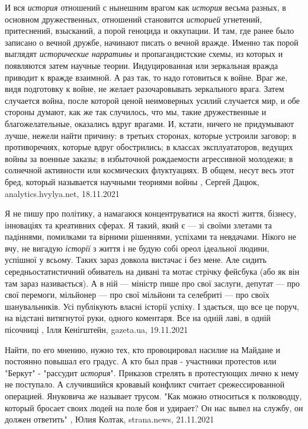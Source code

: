 И вся \emph{история} отношений с нынешним врагом как \emph{история} весьма
разных, в основном дружественных, отношений становится \emph{историей}
угнетений, притеснений, взысканий, а порой геноцида и оккупации.  И там, где
ранее было записано о вечной дружбе, начинают писать о вечной вражде. Именно
так порой выглядят \emph{исторические нарративы} и пропагандистские схемы, из
которых и появляются затем научные теории.  Индуцированная или зеркальная
вражда приводит к вражде взаимной. А раз так, то надо готовиться к войне. Враг
же, видя подготовку к войне, не желает разочаровывать зеркального врага.  Затем
случается война, после которой ценой неимоверных усилий случается мир, и обе
стороны думают, как же так случилось, что мы, такие дружественные и
благожелательные, оказались вдруг врагами.  И, кстати, ничего не придумывают
лучше, нежели найти причину: в третьих сторонах, которые устроили заговор; в
противоречиях, которые вдруг обострились; в классах эксплуататоров, ведущих
войны за военные заказы; в избыточной рождаемости агрессивной молодежи; в
солнечной активности или космических флуктуациях. В общем, несут весь этот
бред, который называется научными теориями войны
, Сергей Дацюк, analytics.hvylya.net, 18.11.2021

Я не пишу про політику, а намагаюся концентруватися на якості життя, бізнесу,
інноваціях та креативних сферах. Я такий, який є — зі своїми злетами та
падіннями, помилками та вірними рішеннями, успіхами та невдачами. Нікого не
вчу, не вигадую \emph{історії} з життя і не будую собі ореол ідеальної людини,
успішної у всьому. Таких зараз довкола вистачає і без мене.  Але сидить
середньостатистичний обиватель на дивані та мотає стрічку фейсбука (або як він
там зараз називається). А в ній — міністр пише про свої заслуги, депутат — про
свої перемоги, мільйонер — про свої мільйони та селебриті — про своїх
шанувальників. Усі публікують власні історії успіху. І здається, що все це
поруч, на відстані витягнутої руки, одного коментаря. Все на одній лаві, в
одній пісочниці
, 
Ілля Кенігштейн, gazeta.ua, 19.11.2021

Найти, по его мнению, нужно тех, кто провоцировал насилие на Майдане и
постоянно повышал его градус. А кто был прав - участники протестов или "Беркут"
- "рассудит \emph{история}".  Приказов стрелять в протестующих лично к нему не
поступало. А случившийся кровавый конфликт считает срежессированной операцией.
Януковича же называет трусом. "Как можно относиться к полководцу, который
бросает своих людей на поле боя и удирает? Он нас вывел на службу, он должен
ответить"
, 
Юлия Колтак, strana.news, 21.11.2021


